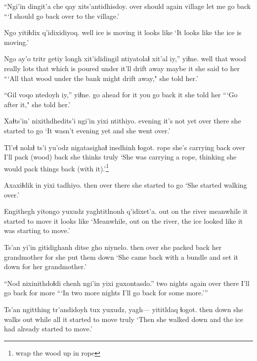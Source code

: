 \documentclass[12pt]{article}
\begin{document}
\gll ``Ngi'in dingit'a che qay     xits'antidhisdoy.
over  should again village {let me go back}
\glt ```I should go back over to the village.'
\glend

\gll Ngo  yitiɬdix      q'idixidiyoq.
well {ice is moving} {it looks like}
\glt `It looks like the ice is moving.'
\glend

\gll Ngo  ay'o tritr getiy  longh xit'ididingil   ntiyatolaɬ         xit'al iy,'' yiɬne.
well that wood  really lots  {that which is poured under} {it'll drift away} maybe  it {she said to her}
\glt ```All that wood under the bank might drift away," she told her.'
\glend

\gll ``Gil      voqo   ntedoyh     iy,'' yiɬne.
{go ahead} {for it} {you go back} it {she told her}
\glt ```Go after it," she told her.'
\glend

\gll Xaɬts'in' {nixithdhedits'i} ngi'in yixi ntithiyo.
evening   {it's not yet}       over   there {she started to go}
\glt `It wasn't evening yet and she went over.'
\glend

\gll Tl'eɬ nolaɬ          ts'i yu'odz    nigatasighaɬ      inedhinh ɬogot.
rope  {she's carrying} {}    {back over} {I'll pack (wood) back} {she thinks} truly
\glt `She was carrying a rope, thinking she would pack things back (with it).'\footnote{wrap the wood up in rope}
\glend

\gll Axaxiɬdik in yixi tadhiyo.
then      over  there {she started to go}
\glt `She started walking over.'
\glend

\gll Engithegh         yitongo   yuxudz yaghtitlnonh         q'idixet'a.
{out on the river} meanwhile {}    {it started to move} {it looks like}
\glt `Meanwhile, out on the river, the ice looked like it was starting to move.'
\glend

\gll Ts'an yi'in gitidighanh     ditse           gho niynelo.
then  over  {she packed back} {her grandmother} for {she put them down}
\glt `She came back with a bundle and set it down for her grandmother.'
\glend

\gll ``Nod nixinithdoɬdi chenh ngi'in yixi guxontasdo.''
two nights        again over   there {I'll go back for more}
\glt ```In two more nights I'll go back for some more.'''
\glend

\gll Ts'an ngitthing tr'andidoyh   tux   yuxudz, yagh--- yititldaq ɬogot.
then  down      {she walks out} while all {}  {it started to move} truly
\glt `Then she walked down and the ice had already started to move.'
\glend
\end{document}
